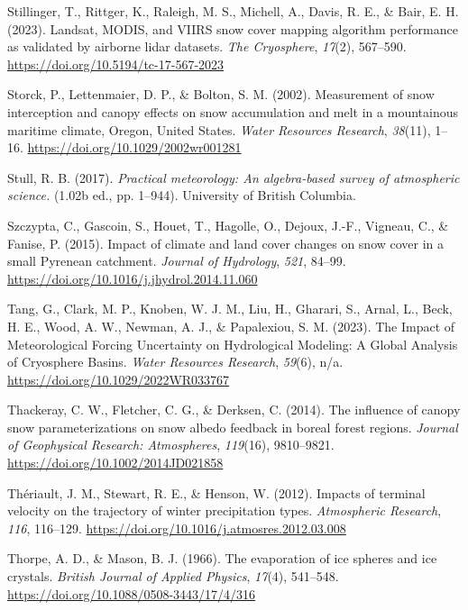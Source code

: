 \documentclass[
  letterpaper,
]{tex/uofsthesis-cs}
\newlength{\cslhangindent}
\newenvironment{CSLReferences}[2] %
 {\begin{list}{}{%
  \setlength{\itemindent}{0pt}
  \setlength{\leftmargin}{0pt}
  \setlength{\parsep}{0pt}
  \ifodd #1
   \setlength{\leftmargin}{\cslhangindent}
   \setlength{\itemindent}{-1\cslhangindent}
  \fi
  \setlength{\itemsep}{#2\baselineskip}}}
 {\end{list}}
\begin{document}
\begin{CSLReferences}{1}{0}
Stillinger, T., Rittger, K., Raleigh, M. S., Michell, A., Davis, R. E.,
\& Bair, E. H. (2023). Landsat, {MODIS}, and {VIIRS} snow cover mapping
algorithm performance as validated by airborne lidar datasets. \emph{The
Cryosphere}, \emph{17}(2), 567--590.
\url{https://doi.org/10.5194/tc-17-567-2023}

Storck, P., Lettenmaier, D. P., \& Bolton, S. M. (2002). Measurement of
snow interception and canopy effects on snow accumulation and melt in a
mountainous maritime climate, {Oregon}, {United States}. \emph{Water
Resources Research}, \emph{38}(11), 1--16.
\url{https://doi.org/10.1029/2002wr001281}

Stull, R. B. (2017). \emph{Practical meteorology: {An} algebra-based
survey of atmospheric science.} (1.02b ed., pp. 1--944). University of
British Columbia.

Szczypta, C., Gascoin, S., Houet, T., Hagolle, O., Dejoux, J.-F.,
Vigneau, C., \& Fanise, P. (2015). Impact of climate and land cover
changes on snow cover in a small {Pyrenean} catchment. \emph{Journal of
Hydrology}, \emph{521}, 84--99.
\url{https://doi.org/10.1016/j.jhydrol.2014.11.060}

Tang, G., Clark, M. P., Knoben, W. J. M., Liu, H., Gharari, S., Arnal,
L., Beck, H. E., Wood, A. W., Newman, A. J., \& Papalexiou, S. M.
(2023). The {Impact} of {Meteorological Forcing Uncertainty} on
{Hydrological Modeling}: {A Global Analysis} of {Cryosphere Basins}.
\emph{Water Resources Research}, \emph{59}(6), n/a.
\url{https://doi.org/10.1029/2022WR033767}

Thackeray, C. W., Fletcher, C. G., \& Derksen, C. (2014). The influence
of canopy snow parameterizations on snow albedo feedback in boreal
forest regions. \emph{Journal of Geophysical Research: Atmospheres},
\emph{119}(16), 9810--9821. \url{https://doi.org/10.1002/2014JD021858}

Thériault, J. M., Stewart, R. E., \& Henson, W. (2012). Impacts of
terminal velocity on the trajectory of winter precipitation types.
\emph{Atmospheric Research}, \emph{116}, 116--129.
\url{https://doi.org/10.1016/j.atmosres.2012.03.008}

Thorpe, A. D., \& Mason, B. J. (1966). The evaporation of ice spheres
and ice crystals. \emph{British Journal of Applied Physics},
\emph{17}(4), 541--548. \url{https://doi.org/10.1088/0508-3443/17/4/316}


\end{CSLReferences}
\end{document}
